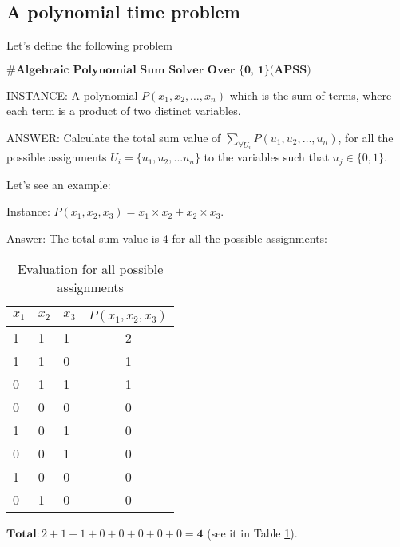 \documentclass[a4paper,UKenglish,cleveref, autoref]{lipics-v2019}
\begin{document}
\subsection{A polynomial time problem}

Let's define the following problem

\begin{definition}
\label{definition-apss}
$\#\textbf{Algebraic Polynomial Sum Solver Over \{0, 1\}(APSS)}$

INSTANCE: A polynomial $P(x_{1}, x_{2}, \ldots, x_{n})$ which is the sum of terms, where each term is a product of two distinct variables.

ANSWER: Calculate the total sum value of $\sum_{\forall U_{i}} P(u_{1}, u_{2}, \ldots, u_{n})$, for all the possible assignments $U_{i} = \{u_{1}, u_{2}, ... u_{n}\}$ to the variables such that $u_{j} \in \{0, 1\}$.
\end{definition}

Let's see an example:

Instance: $P(x_{1}, x_{2}, x_{3}) = x_{1} \times x_{2} + x_{2} \times x_{3}$.

Answer: The total sum value is 4 for all the possible assignments:

\begin{table}[]
\caption{Evaluation for all possible assignments}
\label{tab:my-table}
\begin{tabular}{|l|l|l|c|}
$x_{1}$ & $x_{2}$ & $x_{3}$ & $P(x_{1}, x_{2}, x_{3})$ \\
\hline                                                 
1       & 1       & 1       & 2                        \\
1       & 1       & 0       & 1                        \\
0       & 1       & 1       & 1                        \\
0       & 0       & 0       & 0                        \\
1       & 0       & 1       & 0                        \\
0       & 0       & 1       & 0                        \\
1       & 0       & 0       & 0                        \\
0       & 1       & 0       & 0
\end{tabular}
\end{table}

$\textbf{Total}: 2 + 1 + 1 + 0 + 0 + 0 + 0 + 0 = \textbf{4}$ (see it in Table \ref{tab:my-table}).
\end{document}
